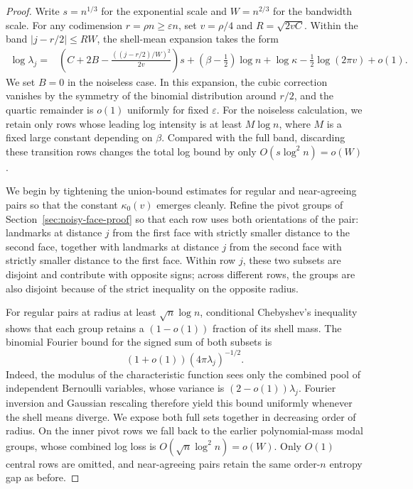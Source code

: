 \begin{proof}
Write \(s=n^{1/3}\) for the exponential scale and \(W=n^{2/3}\) for the bandwidth scale. For any codimension \(r=\rho n\ge\varepsilon n\), set \(v=\rho/4\) and \(R=\sqrt{2vC}\). Within the band \(|j-r/2|\le RW\), the shell-mean expansion takes the form
\[
\begin{split}
 \log\lambda_j={}&
 \left(C+2B-\frac{((j-r/2)/W)^2}{2v}\right)s
   + (\beta-\tfrac12)\log n
   +\log\kappa -\tfrac12\log(2\pi v)+o(1).
\end{split}
\]
We set \(B=0\) in the noiseless case. In this expansion, the cubic correction vanishes by the symmetry of the binomial distribution around \(r/2\), and the quartic remainder is \(o(1)\) uniformly for fixed \(\varepsilon\). For the noiseless calculation, we retain only rows whose leading log intensity is at least \(M\log n\), where \(M\) is a fixed large constant depending on \(\beta\). Compared with the full band, discarding these transition rows changes the total log bound by only \(O(s\log^2 n)=o(W)\).

We begin by tightening the union-bound estimates for regular and near-agreeing pairs so that the constant \(\kappa_0(v)\) emerges cleanly. Refine the pivot groups of Section~\ref{sec:noisy-face-proof} so that each row uses both orientations of the pair: landmarks at distance \(j\) from the first face with strictly smaller distance to the second face, together with landmarks at distance \(j\) from the second face with strictly smaller distance to the first face. Within row \(j\), these two subsets are disjoint and contribute with opposite signs; across different rows, the groups are also disjoint because of the strict inequality on the opposite radius.

For regular pairs at radius at least \(\sqrt n\log n\), conditional Chebyshev's inequality shows that each group retains a \((1-o(1))\) fraction of its shell mass. The binomial Fourier bound for the signed sum of both subsets is
\[
 (1+o(1))(4\pi\lambda_j)^{-1/2}.
\]
Indeed, the modulus of the characteristic function sees only the combined pool of independent Bernoulli variables, whose variance is \((2-o(1))\lambda_j\). Fourier inversion and Gaussian rescaling therefore yield this bound uniformly whenever the shell means diverge. We expose both full sets together in decreasing order of radius. On the inner pivot rows we fall back to the earlier polynomial-mass modal groups, whose combined log loss is \(O(\sqrt n\log^2 n)=o(W)\). Only \(O(1)\) central rows are omitted, and near-agreeing pairs retain the same order-\(n\) entropy gap as before.


\end{proof}
